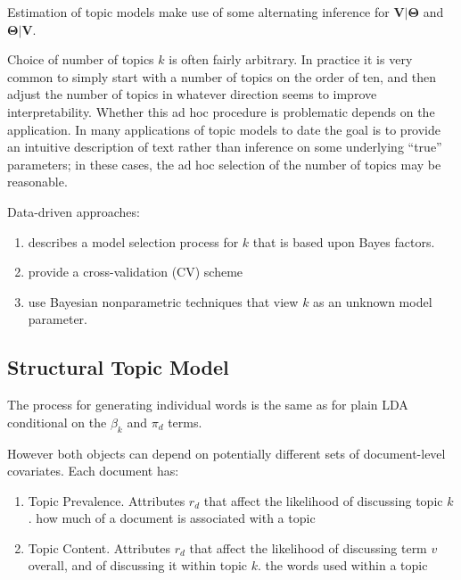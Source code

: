 \documentclass[12pt,a4paper,notitlepage]{article}
\begin{document}
Estimation of topic models make use of some alternating inference for $\boldsymbol{V|\Theta}$ and $\boldsymbol{\Theta|V}$.

\begin{enumerate}
	\item Expectation-maximization algorithm (EM)
	Either maximize the likelihood implied by \ref{eq_1} and \ref{eq_2} or, after incorporating the usual Dirichlet priors on $\boldsymbol{v}_i$ and $\boldsymbol{\theta}_l$ \citep{taddy_estimation_2012} 
	\item Target full posterior distribution $p(\boldsymbol{\Theta,V|c}_i})$
\end{enumerate}

Choice of number of topics $k$ is often fairly arbitrary. In practice it is very common to simply start with a number of topics on the order of ten, and then adjust the number of topics in whatever direction seems to improve interpretability. Whether this ad hoc procedure is problematic depends on the application. In many applications of topic models to date the goal is to provide an intuitive description of text rather than inference on some underlying “true” parameters; in these cases, the ad hoc selection of the number of topics may be reasonable.

Data-driven approaches: 
\begin{enumerate}
	\item \citet{taddy_estimation_2012} describes a model selection process for $k$ that is based upon Bayes factors.
	\item \citet{airoldi_reconceptualizing_2010} provide a cross-validation (CV) scheme
	\item \citet{teh_hierarchical_2006} use Bayesian nonparametric techniques that view $k$ as an unknown model parameter.
\end{enumerate}


\subsection{Structural Topic Model}

The process for generating individual words is the same as for plain LDA conditional on the $\beta_k$ and $\pi_d$ terms. 

However both objects can depend on potentially different sets of document-level covariates. Each document has:
\begin{enumerate}
	\item Topic Prevalence. Attributes $r_d$ that affect the likelihood of discussing topic $k$. how much of a document is associated with a topic
	\item Topic Content. Attributes $r_d$ that affect the likelihood of discussing term $v$ overall, and of discussing it within topic $k$. the words used within a topic
\end{enumerate}
\end{document}
